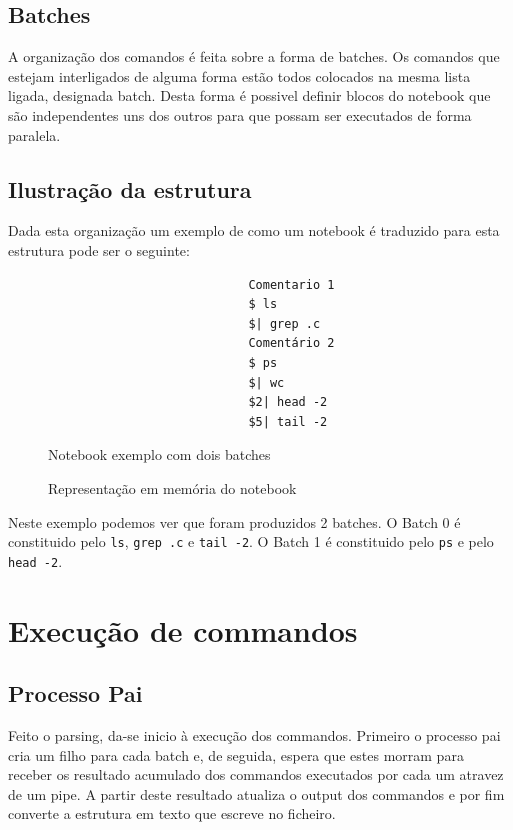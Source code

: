\documentclass[12pt,a4paper]{report}
\begin{document}
    \section{Batches}
        A organização dos comandos é feita sobre a forma de batches. Os comandos
        que estejam interligados de alguma forma estão todos colocados na mesma
        lista ligada, designada batch. Desta forma é possivel definir blocos do
        notebook que são independentes uns dos outros para que possam ser
        executados de forma paralela.

    \section{Ilustração da estrutura}
        Dada esta organização um exemplo de como um notebook é traduzido para
        esta estrutura pode ser o seguinte:

        \begin{figure}[H]
            \begin{verbatim}
                            Comentario 1
                            $ ls
                            $| grep .c
                            Comentário 2
                            $ ps
                            $| wc
                            $2| head -2
                            $5| tail -2
            \end{verbatim}
            \caption{Notebook exemplo com dois batches}
        \end{figure}
        \begin{figure}[H]
            \centering
            
            \caption{Representação em memória do notebook}
        \end{figure}

        Neste exemplo podemos ver que foram produzidos 2 batches. O Batch 0 é
        constituido pelo \texttt{ls}, \texttt{grep .c} e
        \texttt{tail -2}. O Batch 1 é constituido pelo
        \texttt{ps} e pelo \texttt{head -2}.

\chapter{Execução de commandos}

    \section{Processo Pai}
        Feito o parsing, da-se inicio à execução dos commandos. Primeiro o
        processo pai cria um filho para cada batch e, de seguida, espera que
        estes morram para receber os resultado acumulado dos commandos
        executados por cada um atravez de um pipe. A partir deste resultado
        atualiza o output dos commandos e por fim converte a estrutura em
        texto que escreve no ficheiro.
\end{document}
